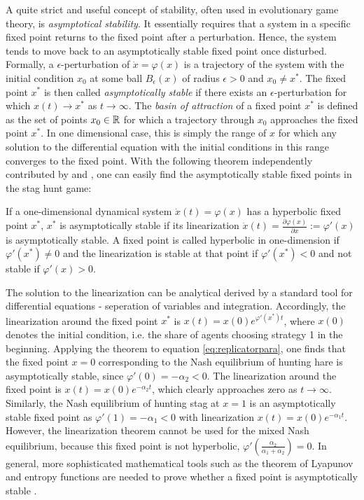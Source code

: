 A quite strict and useful concept of stability, often used in evolutionary 
game theory, is \textit{asymptotical stability}. 
It essentially requires that a system in a specific fixed point returns 
to the fixed point after a perturbation.
Hence, the system tends to move back to an asymptotically stable fixed point
once disturbed. Formally, a $\epsilon$-perturbation of 
$\dot{x} = \varphi(x)$ is a trajectory of the system with the initial
condition $x_0$ at some ball $B_\epsilon(x)$ of radius $\epsilon >0$ and 
$x_0 \neq x^*$. The fixed point $x^*$ is then called \textit{asymptotically
stable} if there exists an $\epsilon$-perturbation for which $x(t) \rightarrow
x^*$ as $t \rightarrow \infty$. 
The \textit{basin of attraction} of a fixed point $x^*$ is defined as the set 
of points $x_0 \in \mathbb{R}$ for which a trajectory through $x_0$ approaches 
the fixed point $x^*$. In one dimensional case, this is simply the range 
of $x$ for which any solution to the differential equation with the initial 
conditions in this range converges to the fixed point. With the following 
theorem independently contributed by \textcite{hartman_lemma_1960} and 
\textcite{grobman_homeomorphism_1959}, one can easily 
find the asymptotically stable fixed points in the stag hunt game:
\begin{mydef}
        If a one-dimensional dynamical system $\dot{x}(t) = \varphi(x)$ 
        has a hyperbolic fixed point $x^*$, $x^*$ is asymptotically stable
        if its linearization 
        $\dot{x}(t) = \frac{\partial\varphi(x)}{\partial x} := \varphi'(x)$ 
        is asymptotically stable. 
        A fixed point is called hyperbolic in one-dimension if 
        $\varphi'(x^*) \neq 0$ and the linearization is stable at that
        point if $\varphi'(x^*) < 0$ and not stable if $\varphi'(x) >0$.
\end{mydef}
The solution to the linearization can be analytical derived by 
a standard tool for differential equations - seperation of variables and 
integration.
Accordingly, the linearization around the fixed point $x^*$ is 
$x(t)= x(0) e^{\varphi'(x^*)t}$, where $x(0)$ denotes the 
initial condition, i.e. the share of agents choosing strategy 1 in the 
beginning.
Applying the theorem to equation \eqref{eq:replicatorpara}, 
one finds that the 
fixed point $x=0$ corresponding to the Nash equilibrium of hunting hare is 
asymptotically stable, since $\varphi'(0) = - \alpha_2 <0$. 
The linearization around the fixed point is $x(t) = x(0) e^{-\alpha_2 t}$, 
which clearly approaches zero as $t \rightarrow \infty$. 
Similarly, the Nash equilibrium 
of hunting stag at $x=1$ is an asymptotically stable fixed point as
$\varphi'(1) = -\alpha_1 <0$ with linearization $x(t) = x(0) e^{-\alpha_1 t}$.
However, the linearization theorem cannot be used for the mixed Nash 
equilibrium, because this fixed point is not hyperbolic, 
$\varphi'(\frac{\alpha_2}{\alpha_1+\alpha_2}) = 0$.
In general, more sophisticated mathematical tools such as the theorem of 
Lyapunov and entropy functions are needed to prove whether a fixed point
is asymptotically stable \parencite{friedman_economic_1998}.

